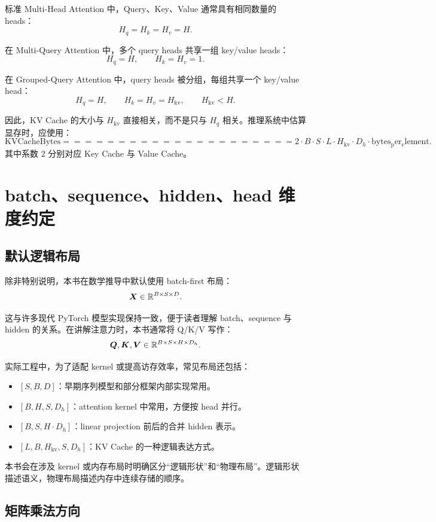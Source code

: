 标准 Multi-Head Attention 中，Query、Key、Value 通常具有相同数量的 heads：
\[
H_q = H_k = H_v = H.
\]

在 Multi-Query Attention 中，多个 query heads 共享一组 key/value heads：
\[
H_q = H,\qquad H_k = H_v = 1.
\]

在 Grouped-Query Attention 中，query heads 被分组，每组共享一个 key/value head：
\[
H_q = H,\qquad H_k = H_v = H_{\mathrm{kv}},\qquad H_{\mathrm{kv}} < H.
\]

因此，KV Cache 的大小与 $H_{\mathrm{kv}}$ 直接相关，而不是只与 $H_q$ 相关。推理系统中估算显存时，应使用：
\[
\mathrm{KVCacheBytes}
=====================

2 \cdot B \cdot S \cdot L \cdot H_{\mathrm{kv}} \cdot D_h \cdot \mathrm{bytes_per_element}.
\]
其中系数 $2$ 分别对应 Key Cache 与 Value Cache。

\section{batch、sequence、hidden、head 维度约定}

\subsection{默认逻辑布局}

除非特别说明，本书在数学推导中默认使用 batch-first 布局：
\[
\bm{X} \in \mathbb{R}^{B \times S \times D}.
\]

这与许多现代 PyTorch 模型实现保持一致，便于读者理解 batch、sequence 与 hidden 的关系。在讲解注意力时，本书通常将 Q/K/V 写作：
\[
\bm{Q}, \bm{K}, \bm{V}
\in
\mathbb{R}^{B \times S \times H \times D_h}.
\]

实际工程中，为了适配 kernel 或提高访存效率，常见布局还包括：

\begin{itemize}
\item $[S, B, D]$：早期序列模型和部分框架内部实现常用。
\item $[B, H, S, D_h]$：attention kernel 中常用，方便按 head 并行。
\item $[B, S, H \cdot D_h]$：linear projection 前后的合并 hidden 表示。
\item $[L, B, H_{\mathrm{kv}}, S, D_h]$：KV Cache 的一种逻辑表达方式。
\end{itemize}

本书会在涉及 kernel 或内存布局时明确区分“逻辑形状”和“物理布局”。逻辑形状描述语义，物理布局描述内存中连续存储的顺序。

\subsection{矩阵乘法方向}

